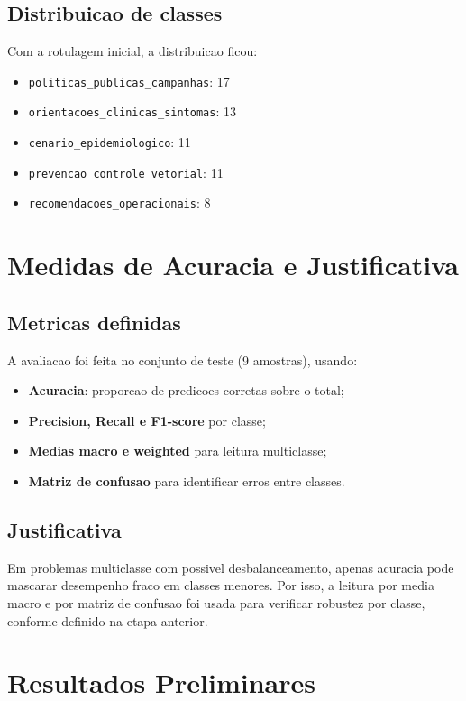 \documentclass[12pt,a4paper]{article}
\begin{document}
\subsection{Distribuicao de classes}
Com a rotulagem inicial, a distribuicao ficou:
\begin{itemize}[leftmargin=1.2cm]
    \item \texttt{politicas\_publicas\_campanhas}: 17
    \item \texttt{orientacoes\_clinicas\_sintomas}: 13
    \item \texttt{cenario\_epidemiologico}: 11
    \item \texttt{prevencao\_controle\_vetorial}: 11
    \item \texttt{recomendacoes\_operacionais}: 8
\end{itemize}

\section{Medidas de Acuracia e Justificativa}
\subsection{Metricas definidas}
A avaliacao foi feita no conjunto de teste (9 amostras), usando:
\begin{itemize}[leftmargin=1.2cm]
    \item \textbf{Acuracia}: proporcao de predicoes corretas sobre o total;
    \item \textbf{Precision, Recall e F1-score} por classe;
    \item \textbf{Medias macro e weighted} para leitura multiclasse;
    \item \textbf{Matriz de confusao} para identificar erros entre classes.
\end{itemize}

\subsection{Justificativa}
Em problemas multiclasse com possivel desbalanceamento, apenas acuracia pode mascarar desempenho fraco em classes menores. Por isso, a leitura por media macro e por matriz de confusao foi usada para verificar robustez por classe, conforme definido na etapa anterior.

\section{Resultados Preliminares}
\end{document}
